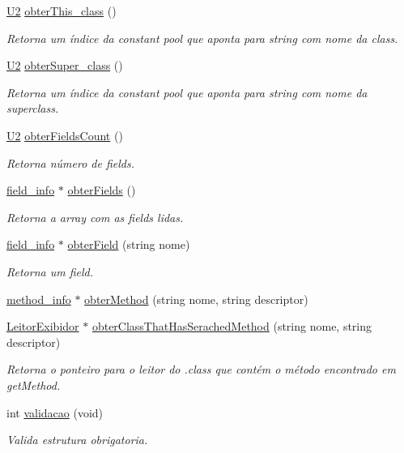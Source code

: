 \begin{DoxyCompactItemize}
\hyperlink{BasicTypes_8h_a90240657108b1b457eef9d3f76e0202e}{U2} \hyperlink{classLeitorExibidor_aa5cc18c3fb83811379d2f221980d8b8b}{obter\+This\+\_\+class} ()
\begin{DoxyCompactList}\small\item\em Retorna um índice da constant pool que aponta para string com nome da class. \end{DoxyCompactList}\item 
\hyperlink{BasicTypes_8h_a90240657108b1b457eef9d3f76e0202e}{U2} \hyperlink{classLeitorExibidor_ab46841a0392f45a35a5444dca234a1ae}{obter\+Super\+\_\+class} ()
\begin{DoxyCompactList}\small\item\em Retorna um índice da constant pool que aponta para string com nome da superclass. \end{DoxyCompactList}\item 
\hyperlink{BasicTypes_8h_a90240657108b1b457eef9d3f76e0202e}{U2} \hyperlink{classLeitorExibidor_a483e90f3d60c63a2b3d1106961c7f553}{obter\+Fields\+Count} ()
\begin{DoxyCompactList}\small\item\em Retorna número de fields. \end{DoxyCompactList}\item 
\hyperlink{structfield__info}{field\+\_\+info} $\ast$ \hyperlink{classLeitorExibidor_a480bbed0d19b7cf5d64753c9c1210464}{obter\+Fields} ()
\begin{DoxyCompactList}\small\item\em Retorna a array com as fields lidas. \end{DoxyCompactList}\item 
\hyperlink{structfield__info}{field\+\_\+info} $\ast$ \hyperlink{classLeitorExibidor_af51949669ace432f66221710ef3a3b00}{obter\+Field} (string nome)
\begin{DoxyCompactList}\small\item\em Retorna um field. \end{DoxyCompactList}\item 
\hyperlink{structmethod__info}{method\+\_\+info} $\ast$ \hyperlink{classLeitorExibidor_a4d1a48fa9825d2cb2b520be79112408c}{obter\+Method} (string nome, string descriptor)
\item 
\hyperlink{classLeitorExibidor}{Leitor\+Exibidor} $\ast$ \hyperlink{classLeitorExibidor_a3893e9478688cf21b293536da48f9f14}{obter\+Class\+That\+Has\+Serached\+Method} (string nome, string descriptor)
\begin{DoxyCompactList}\small\item\em Retorna o ponteiro para o leitor do .class que contém o método encontrado em get\+Method. \end{DoxyCompactList}\item 
int \hyperlink{classLeitorExibidor_a422272b830079ee349b468bbe78d4b13}{validacao} (void)
\begin{DoxyCompactList}\small\item\em Valida estrutura obrigatoria. \end{DoxyCompactList}\end{DoxyCompactItemize}
